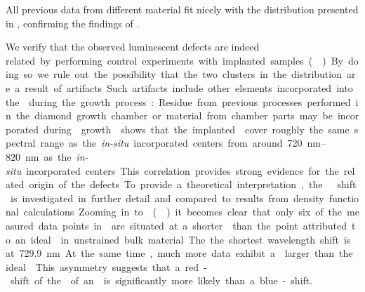 	All previous data from different \nd material fit nicely with the \ZPL distribution presented in , confirming the findings of .
	
	We verify that the observed luminescent defects are indeed \si related by performing control experiments with \si implanted samples (\implantedTao).
	By doing so we rule out the possibility that the two clusters in the distribution are a result of artifacts.
	Such artifacts include other elements incorporated into the \nds during the growth process: Residue from previous processes performed in the diamond growth chamber or material from chamber parts may be incorporated during \nd growth.
	 shows that the implanted \sivs cover roughly the same spectral range as the \textit{in-situ} incorporated centers from around \SIrange{720}{820}{nm} as the \textit{in-situ} incorporated centers.
	This correlation provides strong evidence for the \si related origin of the defects.
	
	To provide a theoretical interpretation, the \ZPL \cwl shift is investigated in further detail and compared to results from density functional calculations.
	Zooming in to \vl () it becomes clear that only six of the measured data points in \vl are situated at a shorter \cwl than the point attributed to an ideal \siv in unstrained bulk material.
	The the shortest wavelength shift is at \SI{729.9}{nm}.
	At the same time, much more data exhibit a \cwl larger than the ideal \siv.
	This asymmetry suggests that a red-shift of the \ZPL of an \siv is significantly more likely than a blue-shift.

